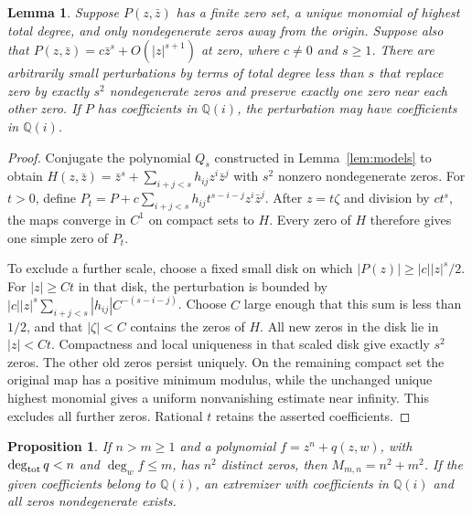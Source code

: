 \documentclass[a4paper]{amsart}
\newtheorem{lem}[thm]{Lemma}
\newtheorem{prop}[thm]{Proposition}
\theoremstyle{remark}
\newcommand{\Q}{\mathbb Q}
\begin{document}
\begin{lem}\label{lem:split}
Suppose \(P(z,\bar z)\) has a finite zero set, a unique
monomial of highest total degree, and only nondegenerate
zeros away from the origin. Suppose also that
\(P(z,\bar z)=c\bar z^s+O(|z|^{s+1})\) at zero,
where \(c\ne0\) and \(s\ge1\).
There are arbitrarily small perturbations by terms of total
degree less than \(s\) that replace zero by exactly \(s^2\)
nondegenerate zeros and preserve exactly one zero near
each other zero. If \(P\) has coefficients in \(\Q(i)\),
the perturbation may have coefficients in \(\Q(i)\).
\end{lem}

\begin{proof}
Conjugate the polynomial \(Q_s\) constructed in
Lemma~\ref{lem:models} to obtain
\(H(z,\bar z)=\bar z^s+\sum_{i+j<s}h_{ij}z^i\bar z^j\)
with \(s^2\) nonzero nondegenerate zeros.
For \(t>0\), define
\(P_t=P+c\sum_{i+j<s}h_{ij}t^{s-i-j}z^i\bar z^j\).
After \(z=t\zeta\) and division by \(ct^s\),
the maps converge in \(C^1\) on compact sets to \(H\).
Every zero of \(H\) therefore gives one simple zero
of \(P_t\).

To exclude a further scale, choose a fixed small disk
on which \(|P(z)|\ge |c||z|^s/2\).
For \(|z|\ge Ct\) in that disk, the perturbation is
bounded by
\(|c||z|^s\sum_{i+j<s}|h_{ij}|C^{-(s-i-j)}\).
Choose \(C\) large enough that this sum is less than
\(1/2\), and that \(|\zeta|<C\) contains the zeros of
\(H\). All new zeros in the disk lie in \(|z|<Ct\).
Compactness and local uniqueness in that scaled disk
give exactly \(s^2\) zeros.
The other old zeros persist uniquely. On the remaining
compact set the original map has a positive minimum
modulus, while the unchanged unique highest monomial
gives a uniform nonvanishing estimate near infinity.
This excludes all further zeros. Rational \(t\) retains
the asserted coefficients.
\end{proof}

\begin{prop}\label{prop:transfer}
If \(n>m\ge1\) and a polynomial
\(f=z^n+q(z,w)\), with \(\deg_{\rm tot}q<n\) and
\(\deg_w f\le m\), has \(n^2\) distinct zeros,
then \(M_{m,n}=n^2+m^2\).
If the given coefficients belong to \(\Q(i)\), an
extremizer with coefficients in \(\Q(i)\) and all
zeros nondegenerate exists.
\end{prop}
\end{document}
